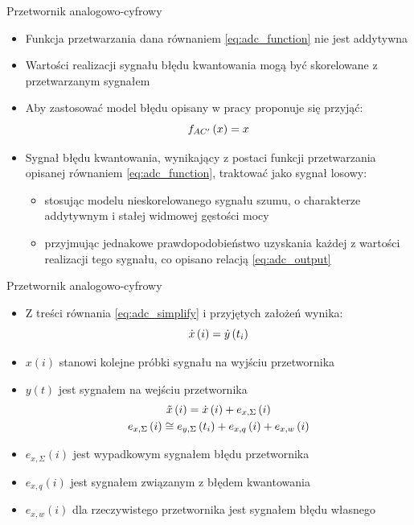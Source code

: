 \documentclass[12pt, polish, aspectratio = 169]{beamer}
\begin{document}
\begin{frame}{Przetwornik analogowo-cyfrowy}
\begin{itemize}
\item Funkcja przetwarzania dana równaniem \eqref{eq:adc_function} nie jest addytywna
\item Wartości realizacji sygnału błędu kwantowania mogą być skorelowane z przetwarzanym sygnałem
\item Aby zastosować model błędu opisany w pracy proponuje się przyjąć:
\begin{equation}
f_{AC'} \left(x\right) = x \label{eq:adc_simplify}
\end{equation}
\item Sygnał błędu kwantowania, wynikający z postaci funkcji przetwarzania opisanej równaniem \eqref{eq:adc_function}, traktować jako sygnał losowy:
	\begin{itemize}
	\item stosując modelu nieskorelowanego sygnału szumu, o charakterze addytywnym i stałej widmowej gęstości mocy
	\item przyjmując jednakowe prawdopodobieństwo uzyskania każdej z wartości realizacji tego sygnału, co opisano relacją \eqref{eq:adc_output}
	\end{itemize}
\end{itemize}
\end{frame}

\begin{frame}{Przetwornik analogowo-cyfrowy}
\begin{itemize}
\item Z treści równania \eqref{eq:adc_simplify} i przyjętych założeń wynika:
\begin{equation}
\dot{x} \left(i\right) = \dot{y} \left(t_{i}\right) \label{eq:adc_out_ideal}
\end{equation}
\item $x(i)$ stanowi kolejne próbki sygnału na wyjściu przetwornika
\item $y(t)$ jest sygnałem na wejściu przetwornika
\begin{gather}
\tilde{x} \left(i\right) = \dot{x} \left(i\right) + e_{x,\Sigma} \left(i\right) \label{eq:adc_out_real} \\
e_{x,\Sigma} \left(i\right) \cong e_{y,\Sigma} \left(t_{i}\right) + e_{x,q} \left(i\right) + e_{x,w} \left(i\right) \label{eq:adc_out_error}
\end{gather}
\item $e_{x,\Sigma}(i)$ jest wypadkowym sygnałem błędu przetwornika
\item $e_{x,q}(i)$ jest sygnałem związanym z błędem kwantowania
\item $e_{x,w}(i)$ dla rzeczywistego przetwornika jest sygnałem błędu własnego
\end{itemize}
\end{frame}
\end{document}
